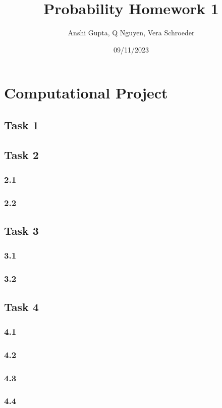 \documentclass[10pt, letterpaper,]{article}
\title{Probability Homework 1}
\author{Anshi Gupta, Q Nguyen, Vera Schroeder}
\date{09/11/2023}
\begin{document}
\maketitle
	\section{Computational Project}
		\subsection{Task 1}
		\subsection{Task 2}
			\subsubsection{2.1}
			\subsubsection{2.2}
		\subsection{Task 3}
			\subsubsection{3.1}
			\subsubsection{3.2}
		\subsection{Task 4}
			\subsubsection{4.1}
			\subsubsection{4.2}
			\subsubsection{4.3}
			\subsubsection{4.4}
			
\end{document}
